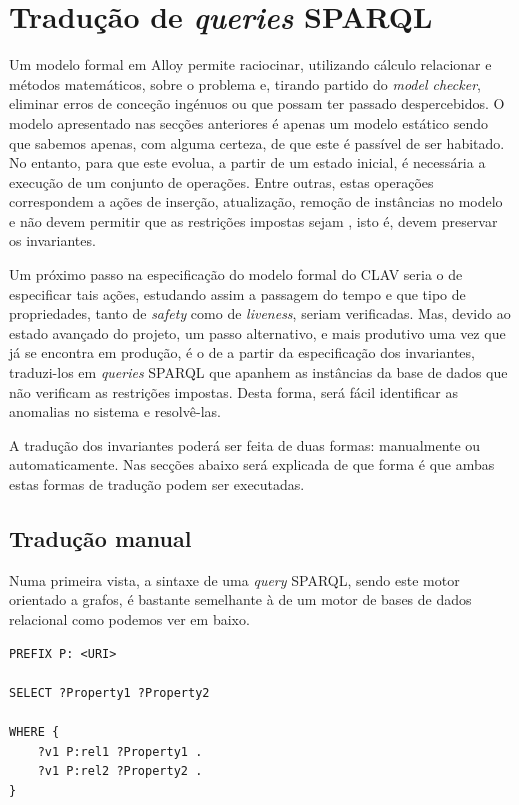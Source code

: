 \documentclass[tikz,runningheads,a4paper]{llncs}
\begin{document}
\section{Tradução de \textit{queries} SPARQL}
\label{SecQueries}

Um modelo formal em Alloy permite raciocinar, utilizando cálculo relacionar e
métodos matemáticos, sobre o problema e, tirando partido do \textit{model
checker}, eliminar erros de conceção ingénuos ou que possam ter passado
despercebidos. O modelo apresentado nas secções anteriores é apenas um modelo
estático sendo que sabemos apenas, com alguma certeza, de que este é passível de
ser habitado. No entanto, para que este evolua, a partir de um estado inicial,
é necessária a execução de um conjunto de operações. Entre outras, estas operações correspondem a
ações de inserção, atualização, remoção de instâncias no modelo e não devem
permitir que as restrições impostas sejam , isto é, devem preservar os invariantes.

Um próximo passo na especificação do modelo formal do CLAV seria o de
especificar tais ações, estudando assim a passagem do tempo e que tipo de
propriedades, tanto de \textit{safety} como de \textit{liveness}, seriam
verificadas. Mas, devido ao estado avançado do projeto, um passo alternativo, e mais produtivo uma vez que já se encontra em produção, é o de
a partir da especificação dos invariantes, traduzi-los em \textit{queries}
SPARQL que apanhem as instâncias da base de dados que não verificam as
restrições impostas. Desta forma, será fácil identificar as anomalias no sistema
e resolvê-las.

A tradução dos invariantes poderá ser feita de duas formas: manualmente ou
automaticamente. Nas secções abaixo será explicada de que forma é que ambas
estas formas de tradução podem ser executadas.

\subsection{Tradução manual}

Numa primeira vista, a sintaxe de uma \textit{query} SPARQL, sendo este motor
orientado a grafos, é bastante semelhante à de um motor de bases de dados
relacional como podemos ver em baixo.

\begin{lstlisting}[language=sparql, frame=single, basicstyle=\scriptsize]
PREFIX P: <URI>

SELECT ?Property1 ?Property2

WHERE {
    ?v1 P:rel1 ?Property1 .
    ?v1 P:rel2 ?Property2 .
}
\end{lstlisting}
\end{document}
